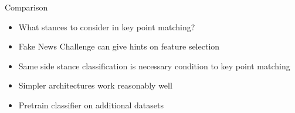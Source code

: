 \documentclass[english,handout]{mlutalk}
\begin{document}
\begin{frame}{Comparison}
  \begin{itemize}
    \item What stances to consider in key point matching?
    \item Fake News Challenge can give hints on feature selection
    \item Same side stance classification is necessary condition to key point matching
    \item Simpler architectures work reasonably well
    \item Pretrain classifier on additional datasets
  \end{itemize}
  \thankyou
\end{frame}

\appendix
\section{\appendixname}

\bibliographyframe
\end{document}
